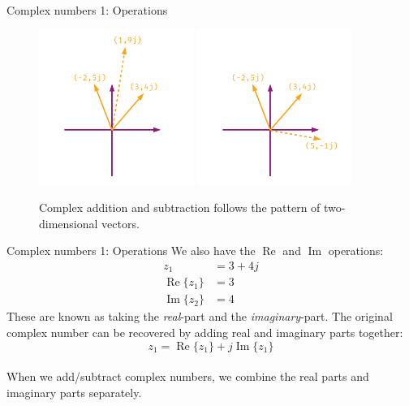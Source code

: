 \documentclass{beamer}
\begin{document}
\begin{frame}{Complex numbers 1: Operations}
\begin{figure}
\centering
\includegraphics[width=0.45\textwidth]{figures/complexNumbers1.pdf}
\includegraphics[width=0.45\textwidth]{figures/complexNumbers2.pdf}
\caption{\label{fig:complex1} Complex addition and subtraction follows the pattern of two-dimensional vectors.}
\end{figure}
\end{frame}

\begin{frame}{Complex numbers 1: Operations}
We also have the $\operatorname{Re}$ and $\operatorname{Im}$ operations:
\begin{align}
z_1 &= 3+4j \\
\operatorname{Re}\lbrace z_1 \rbrace &= 3 \\
\operatorname{Im}\lbrace z_2 \rbrace &= 4
\end{align}
These are known as taking the \textit{real}-part and the \textit{imaginary}-part.  The original complex number can be recovered by adding real and imaginary parts together:
\begin{equation}
z_1 = \operatorname{Re}\lbrace z_1 \rbrace + j \operatorname{Im}\lbrace z_1 \rbrace
\end{equation} \\
When we add/subtract complex numbers, we combine the real parts and imaginary parts separately.
\end{frame}
\end{document}
